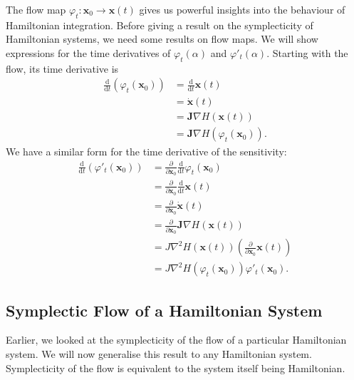 \documentclass{report}
\theoremstyle{exampstyle} \newtheorem{example}[theorem]{Example}
\theoremstyle{exampstyle} \newtheorem{remark}[theorem]{Remark}
\theoremstyle{exampstyle} \newtheorem{definition}[theorem]{Definition}
\theoremstyle{exampstyle} \newtheorem{lemma}[theorem]{Lemma}
\theoremstyle{exampstyle} \newtheorem{proposition}[theorem]{Proposition}
\begin{document}
The flow map $\varphi_t: \mathbf{x}_0 \rightarrow \mathbf{x}(t)$ gives us powerful insights into the behaviour of Hamiltonian integration.
Before giving a result on the symplecticity of Hamiltonian systems, we need some results on flow maps.
We will show expressions for the time derivatives of $\varphi_t(\alpha)$ and $\varphi'_t(\alpha)$.
Starting with the flow, its time derivative is
\begin{align*}
	\frac{\mathrm{d}}{\mathrm{d}t} \left( \varphi_t(\mathbf{x}_0) \right) &= \frac{\mathrm{d}}{\mathrm{d}t} \mathbf{x}(t) \\
	&= \dot{\mathbf{x}}(t) \\
	&= \mathbf{J}\nabla H(\mathbf{x}(t)) \\
	&= \mathbf{J}\nabla H \left( \varphi_t(\mathbf{x}_0) \right).
\end{align*}
We have a similar form for the time derivative of the sensitivity:
\begin{align*}
	\frac{\mathrm{d}}{\mathrm{d}t} \left( \varphi'_t(\mathbf{x}_0) \right) &= \frac{\partial}{\partial \mathbf{x}_0} \frac{\mathrm{d}}{\mathrm{d}t} \varphi_t(\mathbf{x}_0) \\
	&= \frac{\partial}{\partial \mathbf{x}_0} \frac{\mathrm{d}}{\mathrm{d}t} \mathbf{x}(t) \\
	&= \frac{\partial}{\partial \mathbf{x}_0} \dot{\mathbf{x}}(t) \\
	&= \frac{\partial}{\partial \mathbf{x}_0} \mathbf{J}\nabla H(\mathbf{x}(t)) \\
	&= J \nabla^2 H(\mathbf{x}(t)) \left(\frac{\partial}{\partial \mathbf{x}_0} \mathbf{x}(t)\right) \\
	&= J \nabla^2 H(\varphi_t(\mathbf{x}_0))\varphi'_t(\mathbf{x}_0).
\end{align*}

\subsection{Symplectic Flow of a Hamiltonian System}

Earlier, we looked at the symplecticity of the flow of a particular Hamiltonian system.
We will now generalise this result to any Hamiltonian system.
Symplecticity of the flow is equivalent to the system itself being Hamiltonian.
\end{document}
